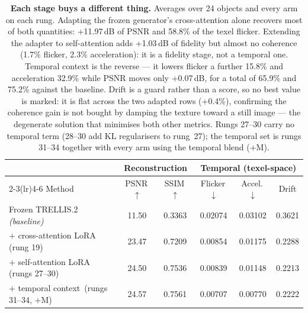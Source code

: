 \begin{table}[t]
\centering
\small
\setlength{\tabcolsep}{4.5pt}
\begin{tabular}{lccccc}
\toprule
& \multicolumn{2}{c}{Reconstruction} & \multicolumn{3}{c}{Temporal (texel-space)} \\
\cmidrule(lr){2-3}\cmidrule(lr){4-6}
Method & PSNR\,$\uparrow$ & SSIM\,$\uparrow$ & Flicker\,$\downarrow$ & Accel.\,$\downarrow$ & Drift \\
\midrule
Frozen TRELLIS.2 \emph{(baseline)} & 11.50 & 0.3363 & 0.02074 & 0.03102 & 0.3621 \\
$+$ cross-attention LoRA \,(rung 19) & 23.47 & 0.7209 & 0.00854 & 0.01175 & 0.2288 \\
$+$ self-attention LoRA \,(rungs 27--30) & 24.50 & 0.7536 & 0.00839 & 0.01148 & 0.2213 \\
$+$ temporal context \,(rungs 31--34, $+$M) & 24.57 & 0.7561 & 0.00707 & 0.00770 & 0.2222 \\
\bottomrule
\end{tabular}
\caption{\textbf{Each stage buys a different thing.} Averages over 24 objects and every
arm on each rung. Adapting the frozen generator's cross-attention alone recovers most of
both quantities: +11.97\,dB of PSNR and 58.8\% of the texel flicker.
Extending the adapter to self-attention adds +1.03\,dB of fidelity but
almost no coherence (1.7\% flicker, 2.3\% acceleration): it is a
fidelity stage, not a temporal one. Temporal context is the reverse --- it lowers flicker a further
15.8\% and acceleration 32.9\% while PSNR moves only
+0.07\,dB, for a total of 65.9\% and
75.2\% against the baseline. Drift is a guard rather than a score, so no
best value is marked: it is flat across the two adapted rows (+0.4\%),
confirming the coherence gain is not bought by damping the texture toward a still image ---
the degenerate solution that minimises both other metrics. Rungs 27--30 carry no temporal
term (28--30 add KL regularisers to rung~27); the temporal set is rungs 31--34 together with
every arm using the temporal blend ($+$M).}
\label{tab:temporal}
\end{table}
